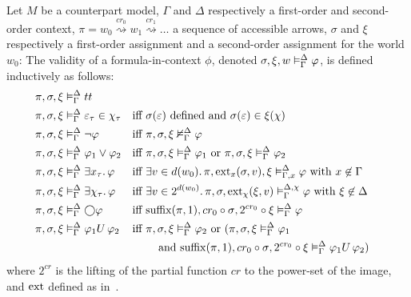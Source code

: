 \begin{definition}
Let $M$ be a counterpart model, $\Gamma$ and $\Delta$ respectively a first-order and second-order context, $\pi = w_0
\overset{cr_0}{\rightsquigarrow} w_1 \overset{cr_1}{\rightsquigarrow} \ldots$ a sequence of accessible arrows,
$\sigma$ and $\xi$ respectively a first-order assignment and a second-order assignment for the world $w_0$:
The validity of a formula-in-context $\phi$, denoted ${\sigma}, {\xi}, {w} \vDash_{\Gamma}^{\Delta} {\varphi}$, is defined
inductively as follows:
\begin{align*}
  \pi, \sigma, \xi &\vDash_\Gamma^\Delta tt \\
  \pi, \sigma, \xi &\vDash_\Gamma^\Delta \varepsilon_\tau \in \chi_\tau
      &&\text{iff } \sigma(\varepsilon) \text{ defined and } \sigma(\varepsilon) \in \xi(\chi) \\
  \pi, \sigma, \xi &\vDash_\Gamma^\Delta \neg\varphi
      &&\text{iff } {\pi}, {\sigma}, {\xi} \nvDash_{\Gamma}^{\Delta} {\varphi} \\
  \pi, \sigma, \xi &\vDash_\Gamma^\Delta \varphi_1 \lor \varphi_2
      &&\text{iff } {\pi}, {\sigma}, {\xi} \vDash_{\Gamma}^{\Delta} {\varphi_1} \text{ or }
      {\pi}, {\sigma}, {\xi} \vDash_{\Gamma}^{\Delta} {\varphi_2} \\
  \pi, \sigma, \xi &\vDash_\Gamma^\Delta \exists {x_\tau} \ldotp {\varphi}
      &&\text{iff } \exists {v \in d(w_0)} \ldotp {{\pi}, {\operatorname{ext}_{x}({\sigma},{v})}, {\xi} \vDash_{\Gamma, x}^{\Delta} {\varphi}} \text{ with }
      x \not\in \Gamma \\
  \pi, \sigma, \xi &\vDash_\Gamma^\Delta \exists {\chi_\tau} \ldotp {\varphi}
      &&\text{iff } \exists {v \in 2^{d(w_0)}} \ldotp {{\pi}, {\sigma}, {\operatorname{ext}_{\chi}({\xi},{v})} \vDash_{\Gamma}^{\Delta,\chi} {\varphi}}
        \text{ with } \xi \not\in \Delta \\
  \pi, \sigma, \xi &\vDash_\Gamma^\Delta \bigcirc{\varphi}
      &&\text{iff } {\operatorname{suffix}(\pi,1)}, {cr_0 \circ \sigma}, {2^{cr_0} \circ \xi} \vDash_{\Gamma}^{\Delta} {\varphi} \\
  \pi, \sigma, \xi &\vDash_\Gamma^\Delta {\varphi_1}U\,{\varphi_2}
     &&\text{iff } {\pi}, {\sigma}, {\xi} \vDash_{\Gamma}^{\Delta} {\varphi_2} \text{ or } ({\pi}, {\sigma}, {\xi} \vDash_{\Gamma}^{\Delta} {\varphi_1} \\
         &&&\qquad\text { and } {\operatorname{suffix}(\pi,1)}, {cr_0 \circ \sigma}, {2^{cr_0} \circ \xi} \vDash_{\Gamma}^{\Delta} {{\varphi_1}U\,{\varphi_2}}) \\
\end{align*}
  where $2^{cr}$ is the lifting of the partial function $cr$ to the power-set of the image, and $\operatorname{ext}$ defined as
  in~.
\end{definition}

